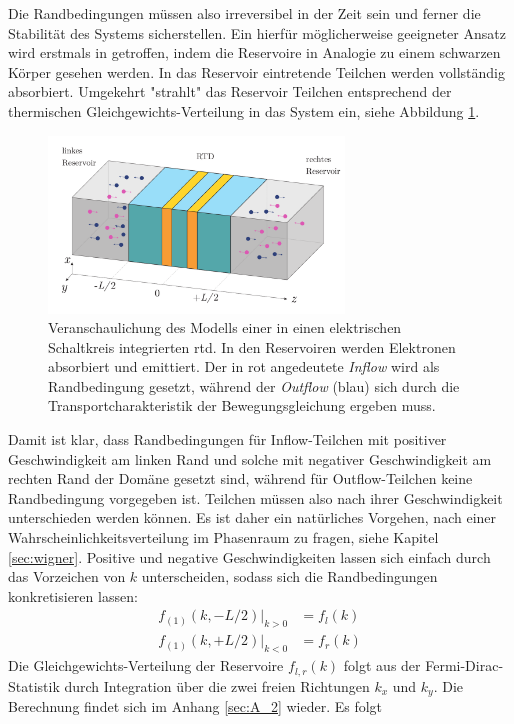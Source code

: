 Die Randbedingungen müssen also irreversibel in der Zeit sein und ferner die Stabilität des Systems sicherstellen. Ein hierfür möglicherweise geeigneter Ansatz wird erstmals in \cite{frensley2} getroffen, indem die Reservoire in Analogie zu einem schwarzen Körper gesehen werden. In das Reservoir eintretende Teilchen werden vollständig absorbiert. Umgekehrt "strahlt" das Reservoir Teilchen entsprechend der thermischen Gleichgewichts-Verteilung in das System ein, siehe Abbildung \ref{fig:modell}.
\begin{figure}
  \centering
  \includegraphics[width=0.7\textwidth]{files/RTD_reservoire.pdf}
  \caption{Veranschaulichung des Modells einer in einen elektrischen Schaltkreis integrierten \ac{rtd}. In den Reservoiren werden Elektronen absorbiert und emittiert. Der in rot angedeutete \emph{Inflow} wird als Randbedingung gesetzt, während der \emph{Outflow} (blau) sich durch die Transportcharakteristik der Bewegungsgleichung ergeben muss.}
  \label{fig:modell}
\end{figure}
Damit ist klar, dass Randbedingungen für Inflow-Teilchen mit positiver Geschwindigkeit am linken Rand und solche mit negativer Geschwindigkeit am rechten Rand der Domäne gesetzt sind, während für Outflow-Teilchen keine Randbedingung vorgegeben ist. Teilchen müssen also nach ihrer Geschwindigkeit unterschieden werden können.
Es ist daher ein natürliches Vorgehen, nach einer Wahrscheinlichkeitsverteilung im Phasenraum zu fragen, siehe Kapitel \ref{sec:wigner}.
Positive und negative Geschwindigkeiten lassen sich einfach durch das Vorzeichen von $k$ unterscheiden, sodass sich die Randbedingungen konkretisieren lassen:
\begin{equation}
  \begin{aligned}
    f_{(1)}(k,-L/2)|_{k>0} &= f_l({k}) \\
    f_{(1)}(k,+L/2)|_{k<0} &= f_r({k})
  \end{aligned}
  \label{eq:rb1}
\end{equation}
Die Gleichgewichts-Verteilung der Reservoire $f_{l,r}(k)$ folgt aus der Fermi-Dirac-Statistik durch Integration über die zwei freien Richtungen $k_x$ und $k_y$. Die Berechnung findet sich im Anhang \ref{sec:A_2} wieder. Es folgt
